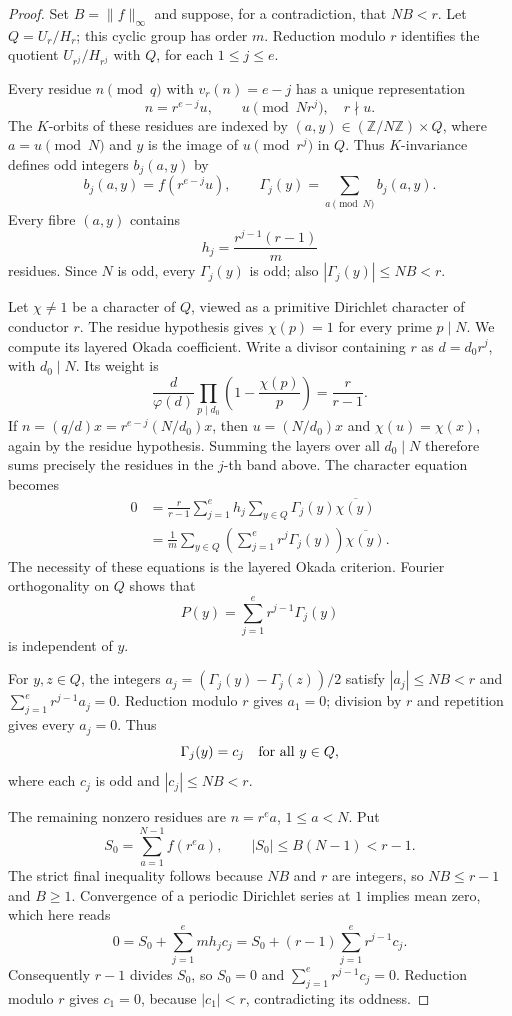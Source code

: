 \documentclass[11pt]{amsart}
\theoremstyle{definition}
\theoremstyle{remark}
\numberwithin{equation}{section}
\begin{document}
\begin{proof}
Set $B=\lVert f\rVert_\infty$ and suppose, for a contradiction, that
$NB<r$.  Let $Q=U_r/H_r$; this cyclic group has order $m$.  Reduction
modulo $r$ identifies the quotient $U_{r^j}/H_{r^j}$ with $Q$, for each
$1\leq j\leq e$.

Every residue $n\pmod q$ with $v_r(n)=e-j$ has a unique representation
\[
 n=r^{e-j}u,\qquad u\pmod {Nr^j},\quad r\nmid u.
\]
The $K$-orbits of these residues are indexed by
$(a,y)\in(\mathbb Z/N\mathbb Z)\times Q$, where $a=u\pmod N$ and $y$
is the image of $u\pmod {r^j}$ in $Q$.  Thus $K$-invariance defines
odd integers $b_j(a,y)$ by
\[
 b_j(a,y)=f(r^{e-j}u),\qquad
 \Gamma_j(y)=\sum_{a\pmod N}b_j(a,y).
\]
Every fibre $(a,y)$ contains
\[
 h_j=\frac{r^{j-1}(r-1)}m
\]
residues.  Since $N$ is odd, every $\Gamma_j(y)$ is odd; also
$|\Gamma_j(y)|\leq NB<r$.

Let $\chi\ne1$ be a character of $Q$, viewed as a primitive Dirichlet
character of conductor $r$.  The residue hypothesis gives
$\chi(p)=1$ for every prime $p\mid N$.  We compute its layered Okada
coefficient.  Write a divisor containing $r$ as $d=d_0r^j$, with
$d_0\mid N$.  Its weight is
\[
 \frac{d}{\varphi(d)}
 \prod_{p\mid d_0}\left(1-\frac{\chi(p)}p\right)
 =\frac r{r-1}.
\]
If $n=(q/d)x=r^{e-j}(N/d_0)x$, then $u=(N/d_0)x$ and
$\chi(u)=\chi(x)$, again by the residue hypothesis.  Summing the layers
over all $d_0\mid N$ therefore sums precisely the residues in the
$j$-th band above.  The character equation becomes
\begin{align*}
 0
 &=\frac r{r-1}\sum_{j=1}^e h_j
      \sum_{y\in Q}\Gamma_j(y)\overline{\chi(y)}\\
 &=\frac1m\sum_{y\in Q}
       \left(\sum_{j=1}^e r^j\Gamma_j(y)\right)
       \overline{\chi(y)}.
\end{align*}
The necessity of these equations is the layered Okada criterion.
Fourier orthogonality on $Q$ shows that
\[
 P(y)=\sum_{j=1}^e r^{j-1}\Gamma_j(y)
\]
is independent of $y$.

For $y,z\in Q$, the integers
$a_j=(\Gamma_j(y)-\Gamma_j(z))/2$ satisfy $|a_j|\leq NB<r$ and
$\sum_{j=1}^e r^{j-1}a_j=0$.  Reduction modulo $r$ gives $a_1=0$;
division by $r$ and repetition gives every $a_j=0$.  Thus
\[
 \Gamma_j(y)=c_j\quad\hbox{for all }y\in Q,
\]
where each $c_j$ is odd and $|c_j|\leq NB<r$.

The remaining nonzero residues are $n=r^e a$, $1\leq a<N$.  Put
\[
 S_0=\sum_{a=1}^{N-1}f(r^e a),\qquad
 |S_0|\leq B(N-1)<r-1.
\]
The strict final inequality follows because $NB$ and $r$ are integers,
so $NB\leq r-1$ and $B\geq1$.
Convergence of a periodic Dirichlet series at $1$ implies mean zero,
which here reads
\[
 0=S_0+\sum_{j=1}^e mh_jc_j
   =S_0+(r-1)\sum_{j=1}^e r^{j-1}c_j.
\]
Consequently $r-1$ divides $S_0$, so $S_0=0$ and
$\sum_{j=1}^e r^{j-1}c_j=0$.  Reduction modulo $r$ gives $c_1=0$,
because $|c_1|<r$, contradicting its oddness.
\end{proof}
\end{document}
